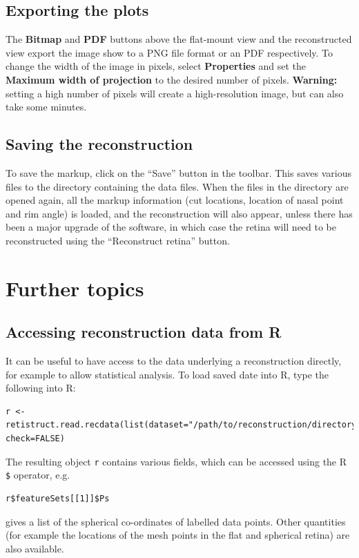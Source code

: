 \documentclass{book}
\begin{document}
\section{Exporting the plots}
\label{retistruct-user-guide:sec:exporting-plots}

The \textbf{Bitmap} and \textbf{PDF} buttons above the flat-mount view
and the reconstructed view export the image show to a PNG file format
or an PDF respectively. To change the width of the image in pixels,
select \textbf{Properties} and set the
\textbf{Maximum width of projection} to the desired number of pixels.
\textbf{Warning:} setting a high number of pixels will create a
high-resolution image, but can also take some minutes.

\section{Saving the reconstruction}
\label{manual:sec:saving-reconstr}

To save the markup, click on the ``Save'' button in the toolbar. This
saves various files to the directory containing the data files. When
the files in the directory are opened again, all the markup
information (cut locations, location of nasal point and rim angle) is
loaded, and the reconstruction will also appear, unless there has been
a major upgrade of the software, in which case the retina will need to
be reconstructed using the ``Reconstruct retina'' button.

\chapter{Further topics}
\label{retistruct-user-guide:cha:advanced-topics}

\section{Accessing reconstruction data from R}
\label{retistruct-user-guide:sec:reading-date-into}

It can be useful to have access to the data underlying a
reconstruction directly, for example to allow statistical analysis.
To load saved date into R, type the following into R:
\begin{verbatim}
r <-
retistruct.read.recdata(list(dataset="/path/to/reconstruction/directory"),
check=FALSE)
\end{verbatim}
The resulting object \texttt{r} contains various fields, which can be
accessed using the R \texttt{\$} operator, e.g.
\begin{verbatim}
r$featureSets[[1]]$Ps
\end{verbatim}
gives a list of the spherical co-ordinates of labelled data points.
Other quantities (for example the locations of the mesh points in the
flat and spherical retina) are also available.
\end{document}
